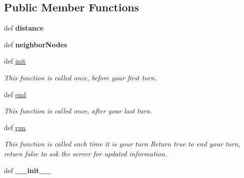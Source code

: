 \subsection*{\-Public \-Member \-Functions}
\begin{DoxyCompactItemize}
\item 
\hypertarget{classAI_1_1AI_abf89b13420a9bf2aa817ed12c327693f}{def {\bfseries distance}}\label{classAI_1_1AI_abf89b13420a9bf2aa817ed12c327693f}

\item 
\hypertarget{classAI_1_1AI_a51886a9807b5c8c78ed39c2158bdef83}{def {\bfseries neighbor\-Nodes}}\label{classAI_1_1AI_a51886a9807b5c8c78ed39c2158bdef83}

\item 
\hypertarget{classAI_1_1AI_a8bb330b74f9b23a5a99b19c12bb5777a}{def \hyperlink{classAI_1_1AI_a8bb330b74f9b23a5a99b19c12bb5777a}{init}}\label{classAI_1_1AI_a8bb330b74f9b23a5a99b19c12bb5777a}

\begin{DoxyCompactList}\small\item\em \-This function is called once, before your first turn. \end{DoxyCompactList}\item 
\hypertarget{classAI_1_1AI_a159aa88ec3715d7897fa16626c028f56}{def \hyperlink{classAI_1_1AI_a159aa88ec3715d7897fa16626c028f56}{end}}\label{classAI_1_1AI_a159aa88ec3715d7897fa16626c028f56}

\begin{DoxyCompactList}\small\item\em \-This function is called once, after your last turn. \end{DoxyCompactList}\item 
\hypertarget{classAI_1_1AI_a3ee9bbe0755a666e6c6ea4016488a6b0}{def \hyperlink{classAI_1_1AI_a3ee9bbe0755a666e6c6ea4016488a6b0}{run}}\label{classAI_1_1AI_a3ee9bbe0755a666e6c6ea4016488a6b0}

\begin{DoxyCompactList}\small\item\em \-This function is called each time it is your turn \-Return true to end your turn, return false to ask the server for updated information. \end{DoxyCompactList}\item 
\hypertarget{classAI_1_1AI_a7f3b078b9159657d003cedb868264852}{def {\bfseries \-\_\-\-\_\-init\-\_\-\-\_\-}}\label{classAI_1_1AI_a7f3b078b9159657d003cedb868264852}

\end{DoxyCompactItemize}
